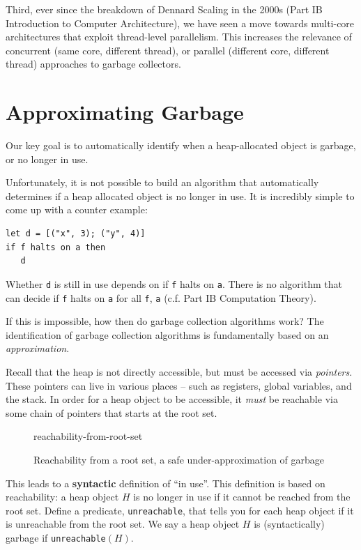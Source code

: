 Third, ever since the breakdown of Dennard Scaling in the 2000s (\textsf{Part IB Introduction to Computer Architecture}), we have seen a move towards multi-core architectures that exploit thread-level parallelism. This increases the relevance of concurrent (same core, different thread), or parallel (different core, different thread) approaches to garbage collectors. 


\section{Approximating Garbage}
Our key goal is to automatically identify when a heap-allocated object is garbage, or no longer in use.

Unfortunately, it is not possible to build an algorithm that automatically determines if a heap allocated object is no longer in use. It is incredibly simple to come up with a counter example:

\begin{verbatim}
let d = [("x", 3); ("y", 4)]
if f halts on a then
   d
\end{verbatim}
Whether \texttt{d} is still in use depends on if \texttt{f} halts on \texttt{a}. There is no algorithm that can decide if \texttt{f} halts on \texttt{a} for all \texttt{f}, \texttt{a} (c.f. \textsf{Part IB Computation Theory}).

If this is impossible, how then do garbage collection algorithms work? The identification of garbage collection algorithms is fundamentally based on an \textit{approximation}. 

Recall that the heap is not directly accessible, but must be accessed via \textit{pointers}. These pointers can live in various places -- such as registers, global variables, and the stack. In order for a heap object to be accessible, it \textit{must} be reachable via some chain of pointers that starts at the root set.  

\begin{figure}
    \centering
    {reachability-from-root-set}
    \caption{Reachability from a root set, a safe under-approximation of garbage}
    \label{fig:reachability-from-root-set}
\end{figure}

This leads to a \textbf{syntactic} definition of ``in use''. This definition is based on reachability: a heap object $H$ is no longer in use if it cannot be reached from the root set. Define a predicate, \texttt{unreachable}, that tells you for each heap object if it is unreachable from the root set. We say a heap object $H$ is (syntactically) garbage if \texttt{unreachable}$(H)$.


